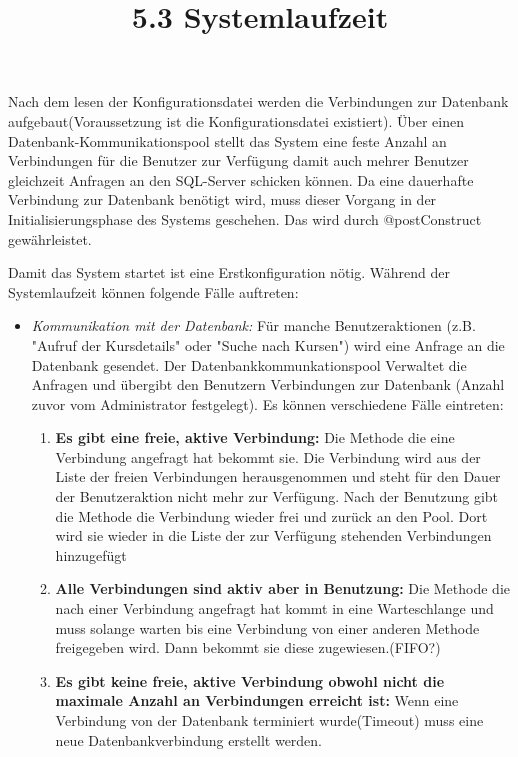 		Nach dem lesen der Konfigurationsdatei werden die Verbindungen zur Datenbank aufgebaut(Voraussetzung ist die Konfigurationsdatei existiert). Über einen Datenbank-Kommunikationspool stellt das System eine feste Anzahl an Verbindungen für die Benutzer zur Verfügung damit auch mehrer Benutzer gleichzeit Anfragen an den SQL-Server schicken können. Da eine dauerhafte Verbindung zur Datenbank benötigt wird, muss dieser Vorgang in der Initialisierungsphase des Systems geschehen. Das wird durch @postConstruct gewährleistet. 
	\title{5.3 Systemlaufzeit}
		Damit das System startet ist eine Erstkonfiguration nötig. Während der Systemlaufzeit können folgende Fälle auftreten:
		\begin{itemize}
			\item \emph{Kommunikation mit der Datenbank:} Für manche Benutzeraktionen (z.B. "Aufruf der Kursdetails" oder "Suche nach Kursen") wird eine Anfrage an die Datenbank gesendet. Der Datenbankkommunkationspool Verwaltet die Anfragen und übergibt den Benutzern Verbindungen zur Datenbank (Anzahl zuvor vom Administrator festgelegt). Es können verschiedene Fälle eintreten:
			\begin{enumerate}
				\item \textbf{Es gibt eine freie, aktive Verbindung:} 
				Die Methode die eine Verbindung angefragt hat bekommt sie. Die Verbindung wird aus der Liste der freien Verbindungen herausgenommen und steht für den Dauer der Benutzeraktion nicht mehr zur Verfügung. Nach der Benutzung gibt die Methode die Verbindung wieder frei und zurück an den Pool. Dort wird sie wieder in die Liste der zur Verfügung stehenden Verbindungen hinzugefügt
				\item \textbf{Alle Verbindungen sind aktiv aber in Benutzung:} 
				Die Methode die nach einer Verbindung angefragt hat kommt in eine Warteschlange und muss solange warten bis eine Verbindung von einer anderen Methode freigegeben wird. Dann bekommt sie diese zugewiesen.(FIFO?)
				\item \textbf{Es gibt keine freie, aktive Verbindung obwohl nicht die maximale Anzahl an Verbindungen erreicht ist:}
				 Wenn eine Verbindung von der Datenbank terminiert wurde(Timeout) muss eine neue Datenbankverbindung erstellt werden.
				

\end{enumerate}
\end{itemize}
